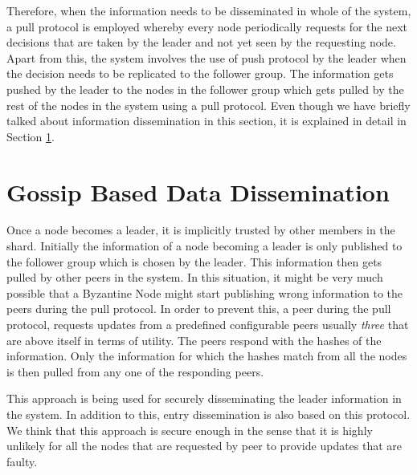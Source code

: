 \documentclass[a4paper,11pt]{kth-mag}
\begin{document}
Therefore, when the information needs to be disseminated in whole of the system, a pull protocol is employed whereby every node periodically requests for the next decisions that are taken by the leader and not yet seen by the requesting node. Apart from this, the system involves the use of push protocol by the leader when the decision needs to be replicated to the follower group. The information gets pushed by the leader to the nodes in the follower group which gets pulled by the rest of the nodes in the system using a pull protocol. Even though we have briefly talked about information dissemination in this section, it is explained in detail in Section \ref{ssec:gossip}.

\section{Gossip Based Data Dissemination}
\label{ssec:gossip}
Once a node becomes a leader, it is implicitly trusted by other members in the shard. Initially the information of a node becoming a leader is only published to the follower group which is chosen by the leader. This information then gets pulled by other peers in the system. In this situation, it might be very much possible that a Byzantine Node might start publishing wrong information to the peers during the pull protocol. In order to prevent this, a peer during the pull protocol, requests updates from a predefined configurable peers usually \textit{three} that are above itself in terms of utility.  The peers respond with the hashes of the information. Only the information for which the hashes match from all the nodes is then pulled from any one of the responding peers.
\par This approach is being used for securely disseminating the leader information in the system. In addition to this, entry dissemination is also based on this protocol. We think that this approach is secure enough in the sense that it is highly unlikely for all the nodes that are requested by peer to provide updates that are faulty.
\end{document}
